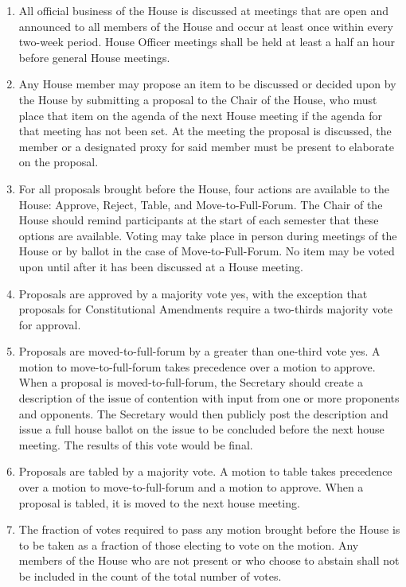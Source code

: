 \documentclass[letterpaper]{article}
\begin{document}
\begin{enumerate}
\begin{enumerate}
\begin{enumerate}
\item All official business of the House is discussed at meetings that are open and announced to all members of the House and occur at least once within every two-week period. House Officer meetings shall be held at least a half an hour before general House meetings.

\item Any House member may propose an item to be discussed or decided upon by the House by submitting a proposal to the Chair of the House, who must place that item on the agenda of the next House meeting if the agenda for that meeting has not been set. At the meeting the proposal is discussed, the member or a designated proxy for said member must be present to elaborate on the proposal.

\item For all proposals brought before the House, four actions are available to the House: Approve, Reject, Table, and Move-to-Full-Forum. The Chair of the House should remind participants at the start of each semester that these options are available. Voting may take place in person during meetings of the House or by ballot in the case of Move-to-Full-Forum. No item may be voted upon until after it has been discussed at a House meeting.

\item Proposals are approved by a majority vote yes, with the exception that proposals for Constitutional Amendments require a two-thirds majority vote for approval.

\item Proposals are moved-to-full-forum by a greater than one-third vote yes. A motion to move-to-full-forum takes precedence over a motion to approve. When a proposal is moved-to-full-forum, the Secretary should create a description of the issue of contention with input from one or more proponents and opponents. The Secretary would then publicly post the description and issue a full house ballot on the issue to be concluded before the next house meeting. The results of this vote would be final.

\item Proposals are tabled by a majority vote. A motion to table takes precedence over a motion to move-to-full-forum and a motion to approve. When a proposal is tabled, it is moved to the next house meeting.

\item The fraction of votes required to pass any motion brought before the House is to be taken as a fraction of those electing to vote on the motion. Any members of the House who are not present or who choose to abstain shall not be included in the count of the total number of votes.


\end{enumerate}
\end{enumerate}
\end{enumerate}
\end{document}
